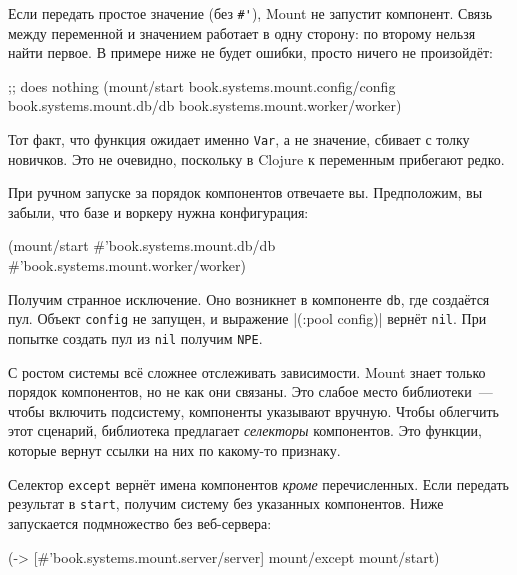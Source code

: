 Если передать простое значение (без \verb|#'|), Mount не запустит
компонент. Связь между переменной и значением работает в одну сторону: по
второму нельзя найти первое. В примере ниже не будет ошибки, просто ничего не
произойдёт:

\begin{english}
  \begin{clojure}
;; does nothing
(mount/start
  book.systems.mount.config/config
  book.systems.mount.db/db
  book.systems.mount.worker/worker)
  \end{clojure}
\end{english}


Тот факт, что функция ожидает именно \verb|Var|, а не значение, сбивает с толку
новичков. Это не очевидно, поскольку в Clojure к переменным прибегают редко.

При ручном запуске за порядок компонентов отвечаете вы. Предположим, вы забыли,
что базе и воркеру нужна конфигурация:

\begin{english}
  \begin{clojure}
(mount/start
  #'book.systems.mount.db/db
  #'book.systems.mount.worker/worker)
  \end{clojure}
\end{english}

Получим странное исключение. Оно возникнет в компоненте \verb|db|, где создаётся
пул. Объект \verb|config| не запущен, и выражение \spverb|(:pool config)| вернёт
\verb|nil|. При попытке создать пул из \verb|nil| получим \verb|NPE|.

С ростом системы всё сложнее отслеживать зависимости. Mount знает только порядок
компонентов, но не как они связаны. Это слабое место библиотеки~--- чтобы
включить подсистему, компоненты указывают вручную. Чтобы облегчить этот
сценарий, библиотека предлагает \emph{селекторы} компонентов. Это функции,
которые вернут ссылки на них по какому-то признаку.

Селектор \verb|except| вернёт имена компонентов \emph{кроме}
перечисленных. Если передать результат в \verb|start|, получим систему без
указанных компонентов. Ниже запускается подмножество без веб-сервера:

\begin{english}
  \begin{clojure}
(-> [#'book.systems.mount.server/server]
    mount/except
    mount/start)
  \end{clojure}
\end{english}

